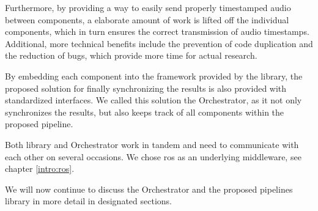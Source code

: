 Furthermore, by providing a way to easily send properly timestamped audio between components, a elaborate amount of work is lifted off the individual components, which in turn ensures the correct transmission of audio timestamps.
Additional, more technical benefits include the prevention of code duplication and the reduction of bugs, which provide more time for actual research.

By embedding each component into the framework provided by the library, the proposed solution for finally synchronizing the results is also provided with standardized interfaces.
We called this solution the Orchestrator, as it not only synchronizes the results, but also keeps track of all components within the proposed pipeline.

Both library and Orchestrator work in tandem and need to communicate with each other on several occasions.
We chose \gls{ros} as an underlying middleware, see chapter \ref{intro:ros}.

We will now continue to discuss the Orchestrator and the proposed pipelines library in more detail in designated sections.



\newpage

\newpage
